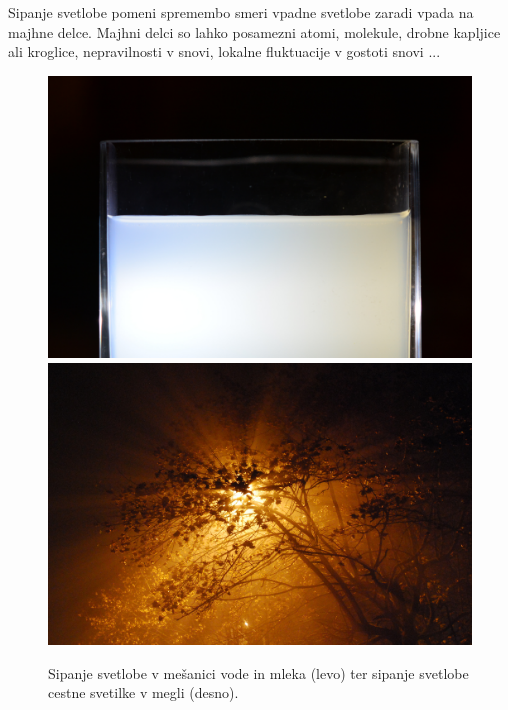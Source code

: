 Sipanje svetlobe pomeni spremembo smeri vpadne svetlobe zaradi vpada na majhne delce. 
Majhni delci so lahko posamezni atomi, molekule, drobne kapljice ali kroglice, 
nepravilnosti v snovi, lokalne fluktuacije v gostoti snovi ... 
\begin{figure}[!h]
\centering
\includegraphics[width=7truecm]{slike/07_mleko.jpg}\hfill
\includegraphics[width=7truecm]{slike/07_megla.jpg}
\caption{Sipanje svetlobe v mešanici vode in mleka (levo) ter sipanje svetlobe 
cestne svetilke v megli (desno).}
\label{fig:07_Sipanje}
\end{figure}

